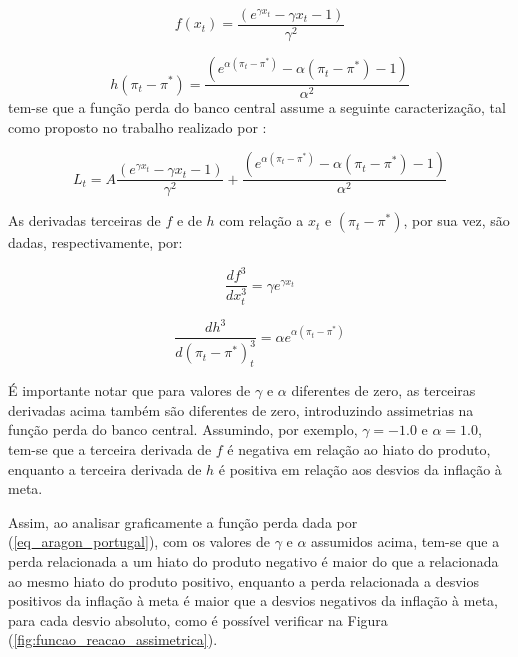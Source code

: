 \documentclass[
	article,			%
	11pt,				%
	oneside,			%
	a4paper,			%
	english,			%
	brazil,				%
	]{abntex2}
\begin{document}
	\begin{equation}
		f(x_t) = \frac{(e^{\gamma x_t} - \gamma x_t - 1)}{\gamma^2} 
	\end{equation}
	
	\begin{equation}	
		h(\pi_t - \pi^*) = \frac{(e^{\alpha (\pi_t - \pi^*)} - \alpha (\pi_t - \pi^*) - 1)}{\alpha^2}
	\end{equation}
%
	tem-se que a função perda do banco central assume a seguinte caracterização, tal como proposto no trabalho realizado por :
	
	\begin{equation} \label{eq_aragon_portugal}
		L_t = A \frac{(e^{\gamma x_t} - \gamma x_t - 1)}{\gamma^2} + \frac{(e^{\alpha (\pi_t - \pi^*)} - \alpha (\pi_t - \pi^*) - 1)}{\alpha^2}
	\end{equation}
	
	As derivadas terceiras de $f$ e de $h$ com relação a $x_t$ e $(\pi_t - \pi^*)$, por sua vez, são dadas, respectivamente, por:
	
	\begin{equation}
		\frac{df^3}{dx_t^3} = \gamma e^{\gamma x_t}
	\end{equation}
	
	\begin{equation}
		\frac{dh^3}{d(\pi_t - \pi^*)_t^3} = \alpha e^{\alpha (\pi_t - \pi^*)}
	\end{equation}
	
	É importante notar que para valores de $\gamma$ e $\alpha$ diferentes de zero, as terceiras derivadas acima também são diferentes de zero, introduzindo assimetrias na função perda do banco central. Assumindo, por exemplo, $\gamma = -1.0$ e $\alpha = 1.0$, tem-se que a terceira derivada de $f$ é negativa em relação ao hiato do produto, enquanto a terceira derivada de $h$ é positiva em relação aos desvios da inflação à meta.
	
	Assim, ao analisar graficamente a função perda dada por (\ref{eq_aragon_portugal}), com os valores de $\gamma$ e $\alpha$ assumidos acima, tem-se que a perda relacionada a um hiato do produto negativo é maior do que a relacionada ao mesmo hiato do produto positivo, enquanto a perda relacionada a desvios positivos da inflação à meta é maior que a desvios negativos da inflação à meta, para cada desvio absoluto, como é possível verificar na Figura (\ref{fig:funcao_reacao_assimetrica}).
		
	\hfill \break
	\hfill \break
	\hfill \break
	\hfill \break
	\hfill \break
\end{document}

